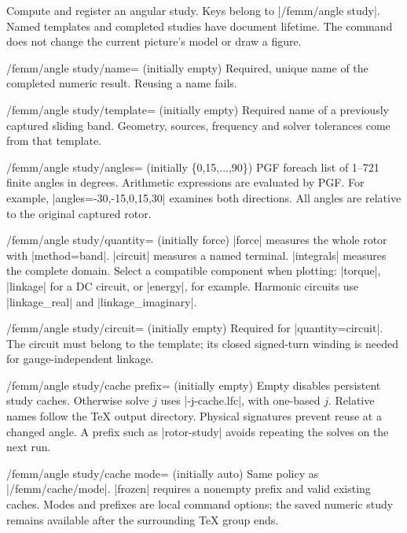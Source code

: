 \begin{command}{\femmanglestudy{}}
  Compute and register an angular study. Keys belong to |/femm/angle study|.
  Named templates and completed studies have document lifetime. The command
  does not change the current picture's model or draw a figure.
\end{command}
\begin{key}{/femm/angle study/name= (initially empty)}
  Required, unique name of the completed numeric result. Reusing a name fails.
\end{key}
\begin{key}{/femm/angle study/template= (initially empty)}
  Required name of a previously captured sliding band. Geometry, sources,
  frequency and solver tolerances come from that template.
\end{key}
\begin{key}{/femm/angle study/angles= (initially \{0,15,...,90\})}
  PGF foreach list of 1--721 finite angles in degrees. Arithmetic expressions
  are evaluated by PGF. For example, |angles={-30,-15,0,15,30}| examines both
  directions. All angles are relative to the original captured rotor.
\end{key}
\begin{key}{/femm/angle study/quantity= (initially force)}
  |force| measures the whole rotor with |method=band|. |circuit| measures a
  named terminal. |integrals| measures the complete domain. Select a compatible
  component when plotting: |torque|, |linkage| for a DC circuit, or |energy|,
  for example. Harmonic circuits use |linkage_real| and |linkage_imaginary|.
\end{key}
\begin{key}{/femm/angle study/circuit= (initially empty)}
  Required for |quantity=circuit|. The circuit must belong to the template;
  its closed signed-turn winding is needed for gauge-independent linkage.
\end{key}
\begin{key}{/femm/angle study/cache prefix= (initially empty)}
  Empty disables persistent study caches. Otherwise solve $j$ uses
  |-j-cache.lfc|, with one-based $j$. Relative names follow the
  TeX output directory. Physical signatures prevent reuse at a changed angle.
  A prefix such as |rotor-study| avoids repeating the solves on the next run.
\end{key}
\begin{key}{/femm/angle study/cache mode= (initially auto)}
  Same policy as |/femm/cache/mode|. |frozen| requires a nonempty prefix and
  valid existing caches. Modes and prefixes are local command options; the
  saved numeric study remains available after the surrounding TeX group ends.
\end{key}

